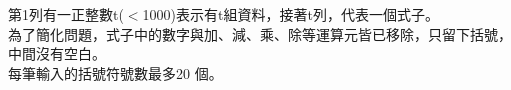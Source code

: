 第1列有一正整數t($<$1000)表示有t組資料，接著t列，代表一個式子。\\
為了簡化問題，式子中的數字與加、減、乘、除等運算元皆已移除，只留下括號，中間沒有空白。\\
每筆輸入的括號符號數最多20 個。\\
